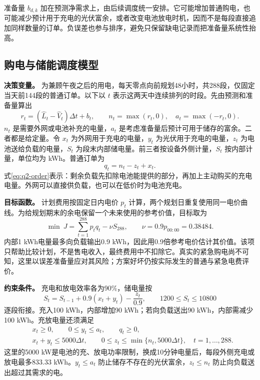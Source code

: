 准备量 $b_{d,k}$ 加在预测净需求上，由后续调度统一安排。它可能增加普通购电，也可能减少预计用于充电的光伏富余，或者改变电池放电时机，因而不是每段直接追加同样数量的订单。负误差也参与排序，避免只保留缺电记录而把准备量系统性抬高。

\subsection{购电与储能调度模型}

\textbf{决策变量。} 为兼顾午夜之后的用电，每天零点向前规划48小时，共288段，仅固定当天前144段的普通订单。以下以 $t$ 表示这两天中连续排列的时段。先由预测和准备量算出
\begin{equation}
r_t=(\widehat L_t-\widehat V_t)\Delta t+b_t,\qquad
n_t=\max(r_t,0),\quad a_t=\max(-r_t,0).
\end{equation}
$n_t$ 是需要外网或电池补充的电量，$a_t$ 是考虑准备量后预计可用于储存的富余。二者都是给定量。令 $x_t$ 为外网用于充电的电量，$y_t$ 为光伏用于充电的电量，$z_t$ 为电池送给负载的电量，$S_t$ 为段末内部储电量。前三者按设备外侧计量，$S_t$ 按内部计量，单位均为 kWh。普通订单为
\begin{equation}
q_t=n_t-z_t+x_t.
\label{eq:q2-order}
\end{equation}
式\eqref{eq:q2-order}表示：剩余负载先扣除电池能提供的部分，再加上主动购买的充电电量。外网可以直接供负载，也可以在低价时为电池充电。

\textbf{目标函数。} 计划费用按固定日内电价 $p_t$ 计算，两个规划日重复使用同一电价曲线。为给规划期末的余电保留一个未来使用的参考价值，目标取为
\begin{equation}
\min\ J=\sum_{t=1}^{288}p_tq_t-\nu S_{288},\qquad
\nu=0.9p_{00:00}=0.38484.
\label{eq:q2-objective}
\end{equation}
内部1 kWh电量最多向负载输出0.9 kWh，因此用0.9倍参考电价估计其价值。该项只帮助比较计划，不是售电收入，最终费用中不扣除它。真实的紧急购电尚不可知，这里以误差准备量应对其风险；方案好坏仍按实际发生的普通与紧急电费评价。

\textbf{约束条件。} 充电和放电效率各为90\%，储电量按
\begin{equation}
S_t=S_{t-1}+0.9(x_t+y_t)-\frac{z_t}{0.9},\qquad
1200\le S_t\le10800
\label{eq:q2-storage}
\end{equation}
逐段衔接。充入100 kWh，内部增加90 kWh；若向负载送出90 kWh，内部需减少100 kWh。充放电量还须满足
\begin{equation}
\begin{aligned}
&x_t\ge0,\qquad 0\le y_t\le a_t,\qquad q_t\ge0,\\
&x_t+y_t\le5000\Delta t,\qquad
0\le z_t\le\min\{n_t,5000\Delta t\},\quad t=1,\ldots,288.
\end{aligned}
\label{eq:q2-bounds}
\end{equation}
这里的5000 kW是电池的充、放电功率限制，换成10分钟电量后，每段外侧充电或放电最多833.33 kWh。$y_t\le a_t$ 防止储存不存在的光伏富余，$z_t\le n_t$ 防止向负载送出超过其需求的电。

